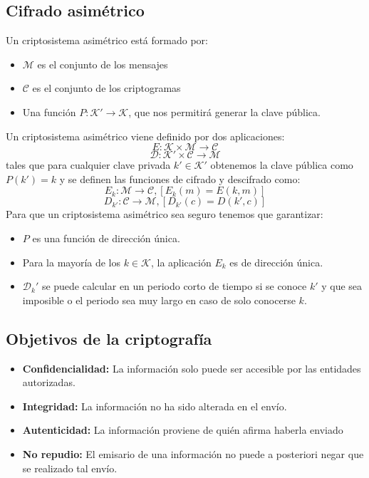 \subsection{Cifrado asimétrico}
Un criptosistema asimétrico está formado por:
\begin{itemize}
	\item $\mathcal{M}$ es el conjunto de los mensajes
	\item $\mathcal{C}$ es el conjunto de los criptogramas
	\item Una función $P:\mathcal{K}' \rightarrow \mathcal{K}$, que nos permitirá generar la clave pública.
\end{itemize}
Un criptosistema asimétrico viene definido por dos aplicaciones:
$$E:\mathcal{K}\times\mathcal{M}\rightarrow\mathcal{C}$$
$$\mathcal{D}:\mathcal{K}'\times\mathcal{C}\rightarrow\mathcal{M}$$
tales que para cualquier clave privada $k' \in \mathcal{K}'$ obtenemos la clave pública como $P(k')=k$ y se definen las funciones de cifrado y descifrado como:
$$
	E_{k}:\mathcal{M}\rightarrow\mathcal{C},[E_{k}(m)=E(k,m)]
$$
$$
	D_{k'}:\mathcal{C}\rightarrow\mathcal{M},[D_{k'}(c)=D(k',c)]
$$
Para que un criptosistema asimétrico sea seguro tenemos que garantizar:
\begin{itemize}
	\item $P$ es una función de dirección única.
	\item Para la mayoría de los $k \in \mathcal{K}$, la aplicación $E_k$ es de dirección única.
	\item $\mathcal{D}_k'$ se puede calcular en un periodo corto de tiempo si se conoce $k'$ y que sea imposible o el periodo sea muy largo en caso de solo conocerse $k$.
\end{itemize}

\subsection{Objetivos de la criptografía}
\begin{itemize}
		\item \textbf{Confidencialidad:} La información solo puede ser accesible por las entidades autorizadas. 
		\item \textbf{Integridad:} La información no ha sido alterada en el envío.
		\item \textbf{Autenticidad:} La información proviene de quién afirma haberla enviado
		\item \textbf{No repudio:} El emisario de una información no puede a posteriori negar que se realizado tal envío.
\end{itemize}

